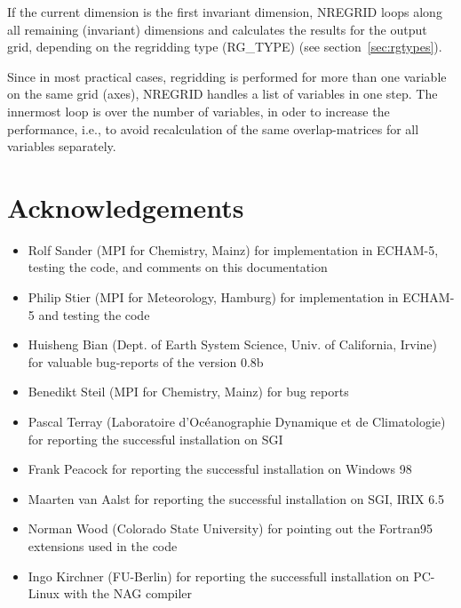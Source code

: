 \documentclass[12pt, a4paper]{article}
\begin{document}
If the current dimension is the first invariant dimension, NREGRID
loops along all remaining (invariant) dimensions
and calculates the results for the output grid, depending on the
regridding type (RG\_TYPE) (see section~\ref{sec:rgtypes}).

Since in most practical cases, regridding is performed for more than one
variable on the same grid (axes), NREGRID handles a list of variables in one
step.
The innermost loop is over the number of variables, in oder to increase the
performance, i.e., to avoid recalculation of the same overlap-matrices
for all variables separately.

\clearpage

\section*{Acknowledgements}
\begin{itemize}
\item Rolf Sander (MPI for Chemistry, Mainz)
      for implementation in ECHAM-5, testing the code, and comments on this
      documentation
\item Philip Stier (MPI for Meteorology, Hamburg)
      for implementation in ECHAM-5 and testing the code
\item Huisheng Bian (Dept. of Earth System Science, Univ. of California,
      Irvine)
      for valuable bug-reports of the version 0.8b
\item Benedikt Steil (MPI for Chemistry, Mainz)
      for bug reports
\item Pascal Terray (Laboratoire d'Oc$\acute{\rm e}$anographie
      Dynamique et de Climatologie)
      for reporting the successful installation on SGI
\item Frank Peacock
      for reporting the successful installation on Windows 98
\item Maarten van Aalst
      for reporting the successful installation on SGI, IRIX 6.5
\item Norman Wood (Colorado State University)
      for pointing out the Fortran95 extensions used in the code
\item Ingo Kirchner (FU-Berlin)
      for reporting the successfull installation on PC-Linux with the
      NAG compiler
\end{itemize}
\end{document}
